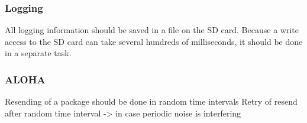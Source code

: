 \subsubsection{Logging}
All logging information should be saved in a file on the SD card. Because a write access to the SD card can take several hundreds of milliseconds, it should be done in a separate task.
%
\subsubsection{ALOHA}
Resending of a package should be done in random time intervals
Retry of resend after random time interval -> in case periodic noise is interfering